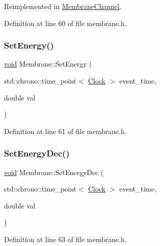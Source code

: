 Reimplemented in \mbox{\hyperlink{class_membrane_channel_a61931feff8f3bb485eeb5c80125bb732}{Membrane\+Channel}}.



Definition at line 60 of file membrane.\+h.

\mbox{\label{class_membrane_a37beeb28761af644bc3a51d3509f14f1}} 
\subsubsection{\texorpdfstring{Set\+Energy()}{SetEnergy()}}
{\footnotesize\ttfamily \mbox{\hyperlink{glad_8h_a950fc91edb4504f62f1c577bf4727c29}{void}} Membrane\+::\+Set\+Energy (\begin{DoxyParamCaption}\item[{std\+::chrono\+::time\+\_\+point$<$ \mbox{\hyperlink{universe_8h_a0ef8d951d1ca5ab3cfaf7ab4c7a6fd80}{Clock}} $>$}]{event\+\_\+time,  }\item[{double}]{val }\end{DoxyParamCaption})\hspace{0.3cm}{\ttfamily [inline]}}



Definition at line 61 of file membrane.\+h.

\mbox{\label{class_membrane_acefb2fe781d7316b232614663777cde1}} 
\subsubsection{\texorpdfstring{Set\+Energy\+Dec()}{SetEnergyDec()}}
{\footnotesize\ttfamily \mbox{\hyperlink{glad_8h_a950fc91edb4504f62f1c577bf4727c29}{void}} Membrane\+::\+Set\+Energy\+Dec (\begin{DoxyParamCaption}\item[{std\+::chrono\+::time\+\_\+point$<$ \mbox{\hyperlink{universe_8h_a0ef8d951d1ca5ab3cfaf7ab4c7a6fd80}{Clock}} $>$}]{event\+\_\+time,  }\item[{double}]{val }\end{DoxyParamCaption})\hspace{0.3cm}{\ttfamily [inline]}}



Definition at line 63 of file membrane.\+h.

